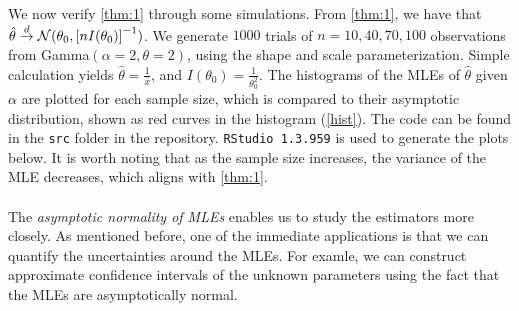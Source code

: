 We now verify \cref{thm:1} through some simulations. From \cref{thm:1}, we have that $\hat{\theta}\overset{d}{\rightarrow} \mathcal{N}(\theta_0, \left[nI(\theta_0)\right]^{-1})$. We generate $1000$ trials of $n=10,40,70,100$ \iid observations from Gamma$(\alpha=2,\theta=2)$, using the shape and scale parameterization. Simple calculation yields $\hat{\theta} = \frac{1}{\bar{x}}$, and $I(\theta_0) = \frac{1}{\theta_0^2}$. The histograms of the MLEs of $\hat{\theta}$ given $\alpha$ are plotted for each sample size, which is compared to their asymptotic distribution, shown as red curves in the histogram (\cref{hist}). The code can be found in the \texttt{src} folder in the repository. \texttt{RStudio 1.3.959} is used to generate the plots below. It is worth noting that as the sample size increases, the variance of the MLE decreases, which aligns with \cref{thm:1}.\\\\
The \emph{asymptotic normality of MLEs} enables us to study the estimators more closely. As mentioned before, one of the immediate applications is that we can quantify the uncertainties around the MLEs. For examle, we can construct approximate confidence intervals of the unknown parameters using the fact that the MLEs are asymptotically normal.
